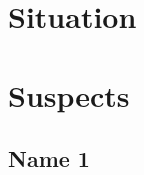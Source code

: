 \documentclass[pdf,final,12pt,a5paper,twoside]{article}
\begin{document}
\section{Situation}


\section{Suspects}

\subsection{Name 1}

% 
\end{document}
